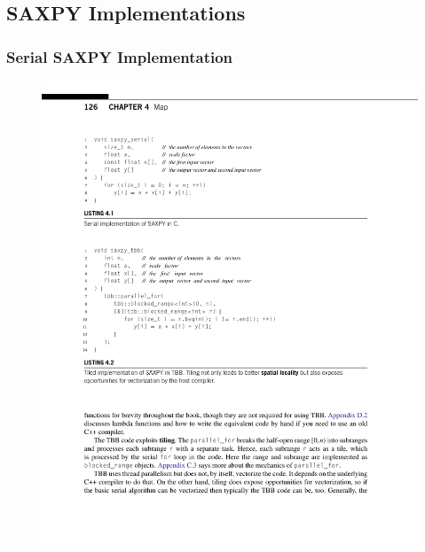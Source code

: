 \documentclass[xcolor=dvipsnames]{beamer}
\begin{document}
	\subsection{SAXPY Implementations}

		\begin{frame} \frametitle{Serial SAXPY Implementation}
			\begin{figure}
				\centering
				\includegraphics[width=115mm]{images/listing-4-1.pdf}
			\end{figure}
		\end{frame}
		
\end{document}

